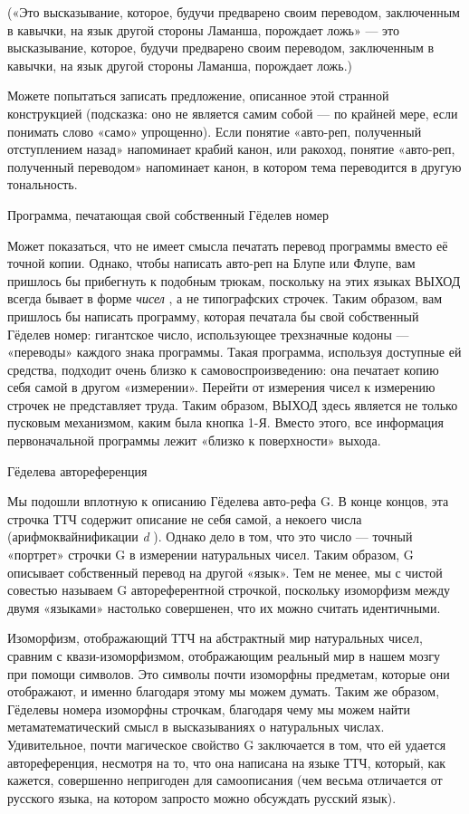 \documentclass[../main.tex]{subfiles}
\begin{document}
(«Это высказывание, которое, будучи предварено своим переводом, заключенным в кавычки, на язык другой стороны Ламанша, порождает ложь» --- это высказывание, которое, будучи предварено своим переводом, заключенным в кавычки, на язык другой стороны Ламанша, порождает ложь.)

Можете попытаться записать предложение, описанное этой странной конструкцией (подсказка: оно не является самим собой --- по крайней мере, если понимать слово «само» упрощенно). Если понятие «авто-реп, полученный отступлением назад» напоминает крабий канон, или ракоход, понятие «авто-реп, полученный переводом» напоминает канон, в котором тема переводится в другую тональность.

Программа, печатающая свой собственный Гёделев номер

Может показаться, что не имеет смысла печатать перевод программы вместо её точной копии. Однако, чтобы написать авто-реп на Блупе или Флупе, вам пришлось бы прибегнуть к подобным трюкам, поскольку на этих языках ВЫХОД всегда бывает в форме \emph{чисел} , а не типографских строчек. Таким образом, вам пришлось бы написать программу, которая печатала бы свой собственный Гёделев номер: гигантское число, использующее трехзначные кодоны --- «переводы» каждого знака программы. Такая программа, используя доступные ей средства, подходит очень близко к самовоспроизведению: она печатает копию себя самой в другом «измерении». Перейти от измерения чисел к измерению строчек не представляет труда. Таким образом, ВЫХОД здесь является не только пусковым механизмом, каким была кнопка 1-Я. Вместо этого, все информация первоначальной программы лежит «близко к поверхности» выхода.

Гёделева автореференция

Мы подошли вплотную к описанию Гёделева авто-рефа G. В конце концов, эта строчка ТТЧ содержит описание не себя самой, а некоего числа (арифмоквайнификации \emph{d} ). Однако дело в том, что это число --- точный «портрет» строчки G в измерении натуральных чисел. Таким образом, G описывает собственный перевод на другой «язык». Тем не менее, мы с чистой совестью называем G автореферентной строчкой, поскольку изоморфизм между двумя «языками» настолько совершенен, что их можно считать идентичными.

Изоморфизм, отображающий ТТЧ на абстрактный мир натуральных чисел, сравним с квази-изоморфизмом, отображающим реальный мир в нашем мозгу при помощи символов. Это символы почти изоморфны предметам, которые они отображают, и именно благодаря этому мы можем думать. Таким же образом, Гёделевы номера изоморфны строчкам, благодаря чему мы можем найти метаматематический смысл в высказываниях о натуральных числах. Удивительное, почти магическое свойство G заключается в том, что ей удается автореференция, несмотря на то, что она написана на языке ТТЧ, который, как кажется, совершенно непригоден для самоописания (чем весьма отличается от русского языка, на котором запросто можно обсуждать русский язык).
\end{document}
